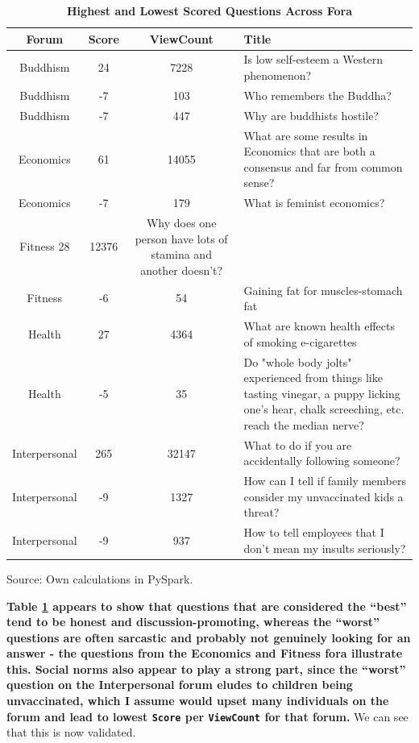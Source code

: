 \documentclass[11pt,preprint, authoryear]{article}
\numberwithin{equation}{section}
\begin{document}
\footnotesize

\begin{longtable} {@{} cccp{11cm} @{}}
\caption{\textbf{Highest and Lowest Scored Questions Across Fora}}
\label{tab:bestworst}\\ 
\toprule
\textbf{Forum} & \textbf{Score} & \textbf{ViewCount} & \textbf{Title} \\ 
\midrule
Buddhism &     24 &       7228 &  Is low self-esteem a Western phenomenon? \\
Buddhism &     -7 &        103 &                 Who remembers the Buddha? \\
Buddhism &     -7 &        447 &                Why are buddhists hostile? \\
\hline
Economics &     61 &      14055 &  What are some results in Economics that are both a consensus and far from common sense? \\
Economics &     -7 &        179 &                                                              What is feminist economics? \\
\hline
Fitness 28 &      12376 &  Why does one person have lots of stamina and another doesn't? \\
Fitness &     -6 &         54 &                            Gaining fat for muscles-stomach fat \\
\hline
Health &     27 &       4364 &  What are known health effects of smoking e-cigarettes \\
Health &     -5 &         35 &  Do "whole body jolts" experienced from things like tasting vinegar, a puppy licking one's hear, chalk screeching, etc. reach the median nerve? \\
\hline
Interpersonal &    265 &      32147 &                     What to do if you are accidentally following someone? \\
Interpersonal &     -9 &       1327 &  How can I tell if family members consider my unvaccinated kids a threat? \\
Interpersonal &     -9 &        937 &             How to tell employees that I don't mean my insults seriously? \\
\bottomrule
\end{longtable}\begin{center} Source: Own calculations in PySpark.\end{center}

\normalsize

\textbf{Table \ref{tab:bestworst} appears to show that questions that
are considered the ``best'' tend to be honest and discussion-promoting,
whereas the ``worst'' questions are often sarcastic and probably not
genuinely looking for an answer - the questions from the Economics and
Fitness fora illustrate this. Social norms also appear to play a strong
part, since the ``worst'' question on the Interpersonal forum eludes to
children being unvaccinated, which I assume would upset many individuals
on the forum and lead to lowest \texttt{Score} per \texttt{ViewCount}
for that forum.} We can see that this is now validated.
\end{document}

